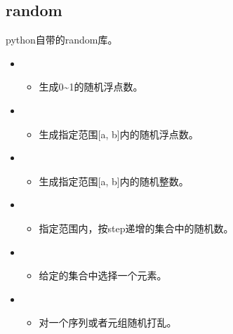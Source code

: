 \documentclass[letterpaper,10pt,english]{sphinxmanual}
\begin{document}
\subsection{random}
\label{\detokenize{python/09_random:id1}}
python自带的random库。

%
\begin{sphinxVerbatim}[commandchars=\\\{\}]
 
\end{sphinxVerbatim}
\begin{itemize}
\item {} 
\begin{itemize}
\item {} 
生成0\textasciitilde{}1的随机浮点数。

\end{itemize}

\item {} 
\begin{itemize}
\item {} 
生成指定范围{[}a, b{]}内的随机浮点数。

\end{itemize}

\item {} 
\begin{itemize}
\item {} 
生成指定范围{[}a, b{]}内的随机整数。

\end{itemize}

\item {} 
\begin{itemize}
\item {} 
指定范围内，按step递增的集合中的随机数。

\end{itemize}

\item {} 
\begin{itemize}
\item {} 
给定的集合中选择一个元素。

\end{itemize}

\item {} 
\begin{itemize}
\item {} 
对一个序列或者元组随机打乱。

\end{itemize}

\end{itemize}
\end{document}
